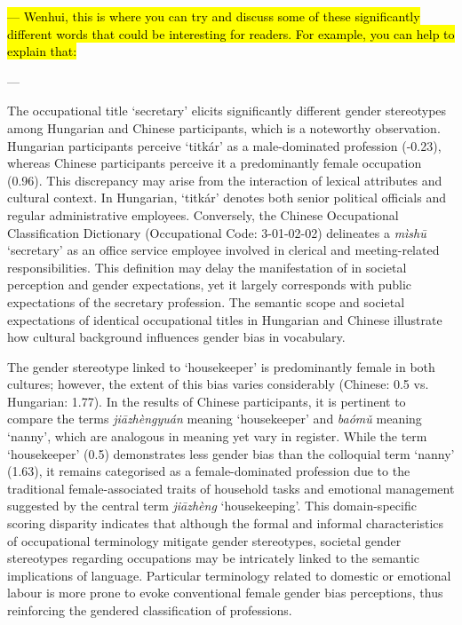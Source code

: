 \documentclass[11pt]{article}
\newcommand{\zh}[1]{\simplifiedchinesefont{#1}\rmfamily}
\begin{document}
\hl{--- Wenhui, this is where you can try and discuss some of these significantly different words that could be interesting for readers. For example, you can help to explain that:} 

---

The occupational title `secretary' elicits significantly different gender stereotypes among Hungarian and Chinese participants, which is a noteworthy observation. Hungarian participants perceive `titkár' as a male-dominated profession (-0.23), whereas Chinese participants perceive it a predominantly female occupation (0.96). This discrepancy may arise from the interaction of lexical attributes and cultural context. In Hungarian, `titkár' denotes both senior political officials and regular administrative employees. Conversely, the Chinese Occupational Classification Dictionary (Occupational Code: 3-01-02-02) delineates a \zh{秘书} \textit{mìshū} `secretary' as an office service employee involved in clerical and meeting-related responsibilities. This definition may delay the manifestation of in societal perception and gender expectations, yet it largely corresponds with public expectations of the secretary profession. The semantic scope and societal expectations of identical occupational titles in Hungarian and Chinese illustrate how cultural background influences gender bias in vocabulary.

The gender stereotype linked to `housekeeper' is predominantly female in both cultures; however, the extent of this bias varies considerably (Chinese: 0.5 vs. Hungarian: 1.77). In the results of Chinese participants, it is pertinent to compare the terms \zh{家政员} \textit{jiāzhèngyuán} meaning `housekeeper' and \zh{保姆} \textit{baómǔ} meaning `nanny', which are analogous in meaning yet vary in register. While the term `housekeeper' (0.5) demonstrates less gender bias than the colloquial term `nanny' (1.63), it remains categorised as a female-dominated profession due to the traditional female-associated traits of household tasks and emotional management suggested by the central term \zh{家政} \textit{jiāzhèng} `housekeeping'. This domain-specific scoring disparity indicates that although the formal and informal characteristics of occupational terminology mitigate gender stereotypes, societal gender stereotypes regarding occupations may be intricately linked to the semantic implications of language. Particular terminology related to domestic or emotional labour is more prone to evoke conventional female gender bias perceptions, thus reinforcing the gendered classification of professions.
\end{document}

